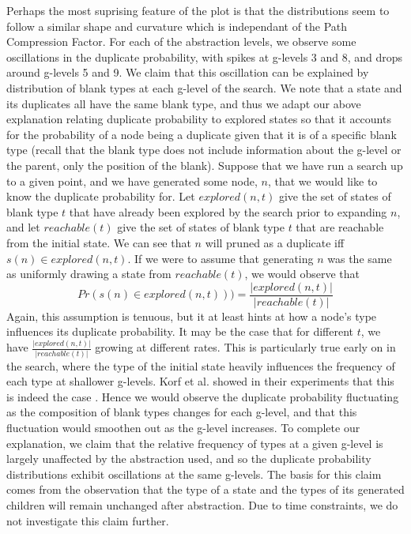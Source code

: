 \documentclass{article}
\begin{document}
Perhaps the most suprising feature of the plot is that the distributions
seem to follow a similar shape and curvature which is independant of
the Path Compression Factor. For each of the abstraction levels,
we observe some oscillations in the duplicate probability,
with spikes at g-levels 3 and 8,
and drops around g-levels 5 and 9.
We claim that this oscillation can be explained by distribution of blank types at each g-level of the search.
We note that a state and its duplicates all have the same blank type,
and thus we adapt our above explanation relating duplicate probability to explored states
so that it accounts for the probability of a node being a duplicate given that it
is of a specific blank type (recall that the blank type does not include information about the g-level or the parent,
only the position of the blank).
Suppose that we have run a search up to a given point, and we have generated some node, \(n\),
that we would like to know the duplicate probability for.
Let \(explored(n, t)\) give the set of states of blank type \(t\) that have already been explored by the search prior to expanding \(n\),
and let \(reachable(t)\) give the set of states of blank type \(t\) that are reachable from the initial state.
We can see that \(n\) will pruned as a duplicate iff \(s(n) \in explored(n, t)\).
If we were to assume that generating \(n\)
was the same as uniformly drawing a state from \(reachable(t)\),
we would observe that \[Pr(s(n) \in explored(n, t))) = \frac{|explored(n, t)|}{|reachable(t)|}\]
Again, this assumption is tenuous,
but it at least hints at how a node's type influences its duplicate probability.
It may be the case that for different \(t\),
we have \( \frac{|explored(n, t)|}{|reachable(t)|} \) growing at different rates.
This is particularly true early on in the search, where the type of the initial state
heavily influences the frequency of each type at shallower g-levels.
Korf et al. showed in their experiments that this is indeed the case \cite{korf2001time}.
Hence we would observe the duplicate probability fluctuating as the composition
of blank types changes for each g-level, and that this fluctuation would smoothen out as the g-level increases.
To complete our explanation,
we claim that the relative frequency of types at a given g-level is largely unaffected by the abstraction used,
and so the duplicate probability distributions exhibit oscillations at the same g-levels.
The basis for this claim comes from the observation that the type of a state and the types of its generated children will
remain unchanged after abstraction. Due to time constraints, we do not investigate this claim further. \\
\end{document}
